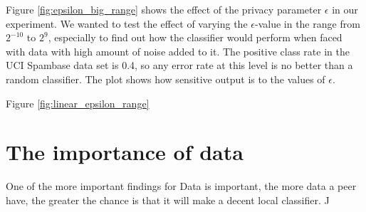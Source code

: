 Figure \ref{fig:epsilon_big_range} shows the effect of the privacy parameter $\epsilon$ in our experiment. We wanted to test the effect of varying the $\epsilon$-value in the range from $2^{-10}$ to $2^9$, especially to find out how the classifier would perform when faced with data with high amount of noise added to it. The positive class rate in the UCI Spambase data set is 0.4, so any error rate at this level is no better than a random classifier. The plot shows how sensitive output is to the values of $\epsilon$.

Figure \ref{fig:linear_epsilon_range} 

\section{The importance of data} \label{importance_of_data}
One of the more important findings for 
Data is important, the more data a peer have, the greater the chance is that it will make a decent local classifier. J

